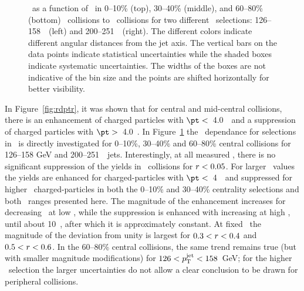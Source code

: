 \begin{figure}
   \caption{\RDptr\ as a function of \pt\ in  0--10\% (top), 30--40\% (middle), and 60--80\% (bottom) \PbPb\ collisions to \pp\ collisions for two different \ptjet\ selections: 126--158~\GeV\ (left) and 200--251~\GeV\ (right). The different colors indicate different angular distances from the jet axis. The vertical bars on the data points indicate statistical uncertainties while the shaded boxes indicate systematic uncertainties. The widths of the boxes are not indicative of the bin size and the points are shifted horizontally for better visibility.}
      \label{fig:pttrkdep}
\end{figure}


In Figure~\ref{fig:rdptr}, it was shown that for central and mid-central collisions, there is an enhancement of
charged particles with $\pt <$~4.0~\GeV\ and a suppression of charged particles with $\pt >$~4.0~\GeV.  In
Figure~\ref{fig:pttrkdep} 
the \pt\ dependance for selections in \rvar\ is directly investigated for 0--10\%, 30--40\% and 60--80\% central 
collisions for 126--158 GeV and 200--251~\GeV\ jets.
Interestingly, at all measured \pt, there is no significant suppression of the yields in \pbpb\ collisions
for $\mbox{$r$} < 0.05$.  For larger \rvar\ values the yields are enhanced for charged-particles with $\pt <$~4~\GeV\ and 
suppressed for higher \pt\ charged-particles in both the 0--10\% and 30--40\% centrality selections and both \ptjet\ 
ranges presented here.  The magnitude of the enhancement increases for decreasing \pt\ at low \pt, while the suppression is enhanced
with increasing \pt at high \pt, until about 10~\GeV, after which it is approximately constant.
At fixed \pt\ the magnitude of the deviation from unity is largest for $0.3< \mbox{$r$} < 0.4$ and $0.5< \mbox{$r$} < 0.6$.
In the 60--80\% central collisions, the same trend remains true (but with smaller magnitude 
modifications) for \mbox{$126 < \mbox{$p_{\mathrm{T}}^{\mathrm{jet}}$} < 158$ GeV}; for the higher \ptjet\ selection the larger uncertainties 
do not allow a clear conclusion to be drawn for peripheral collisions.

